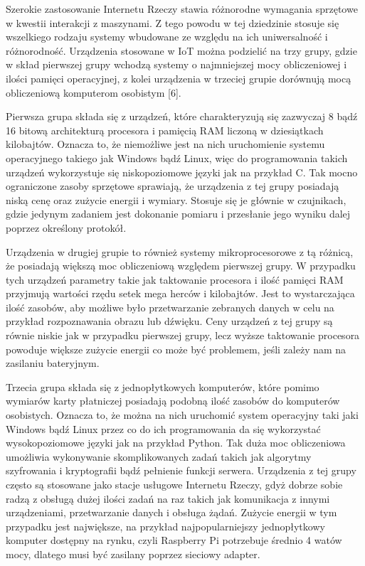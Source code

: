 \documentclass[12pt, twoside, openany]{mwrep}
\begin{document}
Szerokie zastosowanie Internetu Rzeczy stawia różnorodne wymagania sprzętowe w kwestii interakcji z maszynami. Z tego powodu w tej dziedzinie stosuje się wszelkiego rodzaju systemy wbudowane ze względu na ich uniwersalność i różnorodność.  Urządzenia stosowane w IoT można podzielić na trzy grupy, gdzie w skład pierwszej grupy wchodzą systemy o najmniejszej mocy obliczeniowej i ilości pamięci operacyjnej, z kolei urządzenia w trzeciej grupie dorównują mocą obliczeniową komputerom osobistym [6]. 
\par
Pierwsza grupa składa się z urządzeń, które charakteryzują się zazwyczaj 8 bądź 16 bitową architekturą procesora i pamięcią RAM liczoną w dziesiątkach kilobajtów. Oznacza to, że niemożliwe jest na nich uruchomienie systemu operacyjnego takiego jak Windows bądź Linux, więc do programowania takich urządzeń wykorzystuje się niskopoziomowe języki jak na przykład C. Tak mocno ograniczone zasoby sprzętowe sprawiają, że urządzenia z tej grupy posiadają niską cenę oraz zużycie energii i wymiary. Stosuje się je głównie w czujnikach, gdzie jedynym zadaniem jest dokonanie pomiaru i przesłanie jego wyniku dalej poprzez określony protokół. 
\par
Urządzenia w drugiej grupie to również systemy mikroprocesorowe z tą różnicą, że posiadają większą moc obliczeniową względem pierwszej grupy. W przypadku tych urządzeń parametry takie jak taktowanie procesora i ilość pamięci RAM przyjmują wartości rzędu setek mega herców i kilobajtów. Jest to wystarczająca ilość zasobów, aby możliwe było przetwarzanie zebranych danych w celu na przykład rozpoznawania obrazu lub dźwięku. Ceny urządzeń z tej grupy są równie niskie jak w przypadku pierwszej grupy, lecz wyższe taktowanie procesora powoduje większe zużycie energii co może być problemem, jeśli zależy nam na zasilaniu bateryjnym.
\par
Trzecia grupa składa się z jednopłytkowych komputerów, które pomimo wymiarów karty płatniczej posiadają podobną ilość zasobów do komputerów osobistych.  Oznacza to, że można na nich uruchomić system operacyjny taki jaki Windows bądź Linux przez co do ich programowania da się wykorzystać wysokopoziomowe języki jak na przykład Python. Tak duża moc obliczeniowa umożliwia wykonywanie skomplikowanych zadań takich jak algorytmy szyfrowania i kryptografii bądź pełnienie funkcji serwera. Urządzenia z tej grupy często są stosowane jako stacje usługowe Internetu Rzeczy, gdyż dobrze sobie radzą z obsługą dużej ilości zadań na raz takich jak komunikacja z innymi urządzeniami, przetwarzanie danych i obsługa żądań. Zużycie energii w tym przypadku jest największe, na przykład najpopularniejszy jednopłytkowy komputer dostępny na rynku, czyli Raspberry Pi potrzebuje średnio 4 watów mocy, dlatego musi być zasilany poprzez sieciowy adapter.
\end{document}
